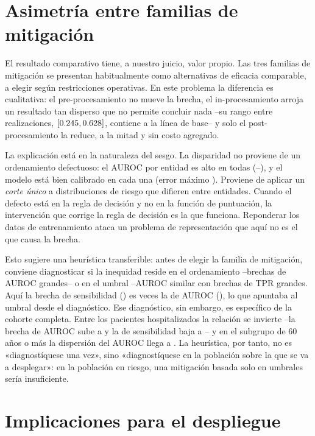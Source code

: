 \section{Asimetría entre familias de mitigación}

El resultado comparativo tiene, a nuestro juicio, valor propio. Las tres familias
de mitigación se presentan habitualmente como alternativas de eficacia
comparable, a elegir según restricciones operativas. En este problema la
diferencia es cualitativa: el pre-procesamiento no mueve la brecha, el
in-procesamiento arroja un resultado tan disperso que no permite concluir nada
--su rango entre realizaciones, $[0.245, 0.628]$, contiene a la línea de
base-- y solo el post-procesamiento la reduce, a la mitad y sin costo agregado.

La explicación está en la naturaleza del sesgo. La disparidad no proviene de un
ordenamiento defectuoso: el AUROC por entidad es alto en todas
(\entPeorAUROC--\entMejorAUROC), y el modelo está bien calibrado en cada una
(error máximo \errCalEntidad). Proviene de aplicar un \emph{corte único} a
distribuciones de riesgo que difieren entre entidades. Cuando el defecto está en
la regla de decisión y no en la función de puntuación, la intervención que corrige
la regla de decisión es la que funciona. Reponderar los datos de entrenamiento
ataca un problema de representación que aquí no es el que causa la brecha.

Esto sugiere una heurística transferible: antes de elegir la familia de
mitigación, conviene diagnosticar si la inequidad reside en el ordenamiento
--brechas de AUROC grandes-- o en el umbral --AUROC similar con brechas de TPR
grandes. Aquí la brecha de sensibilidad (\gapTPRentidad) es \razonBrechas{} veces
la de AUROC (\gapAUROCentidad), lo que apuntaba al umbral desde el diagnóstico.
Ese diagnóstico, sin embargo, es específico de la cohorte completa. Entre los
pacientes hospitalizados la relación se invierte --la brecha de AUROC sube a
\hospGapAUROC{} y la de sensibilidad baja a \hospGapTPR-- y en el subgrupo de 60
años o más la dispersión del AUROC llega a \sesentaRango. La heurística, por
tanto, no es «diagnostíquese una vez», sino «diagnostíquese en la población sobre
la que se va a desplegar»: en la población en riesgo, una mitigación basada solo
en umbrales sería insuficiente.

\section{Implicaciones para el despliegue}

